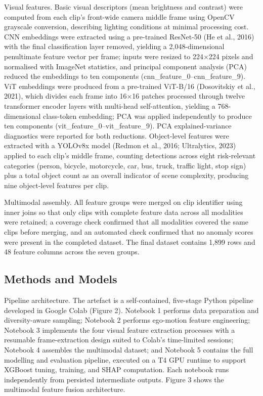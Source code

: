 \documentclass[11pt,a4paper]{article}
\begin{document}
Visual features. Basic visual descriptors (mean brightness and contrast) were computed from each clip's front-wide camera middle frame using OpenCV grayscale conversion, describing lighting conditions at minimal processing cost. CNN embeddings were extracted using a pre-trained ResNet-50 (He et al., 2016) with the final classification layer removed, yielding a 2,048-dimensional penultimate feature vector per frame; inputs were resized to 224$\times$224 pixels and normalised with ImageNet statistics, and principal component analysis (PCA) reduced the embeddings to ten components (cnn\_feature\_0--cnn\_feature\_9). ViT embeddings were produced from a pre-trained ViT-B/16 (Dosovitskiy et al., 2021), which divides each frame into 16$\times$16 patches processed through twelve transformer encoder layers with multi-head self-attention, yielding a 768-dimensional class-token embedding; PCA was applied independently to produce ten components (vit\_feature\_0--vit\_feature\_9). PCA explained-variance diagnostics were reported for both reductions. Object-level features were extracted with a YOLOv8x model (Redmon et al., 2016; Ultralytics, 2023) applied to each clip's middle frame, counting detections across eight risk-relevant categories (person, bicycle, motorcycle, car, bus, truck, traffic light, stop sign) plus a total object count as an overall indicator of scene complexity, producing nine object-level features per clip.

Multimodal assembly. All feature groups were merged on clip identifier using inner joins so that only clips with complete feature data across all modalities were retained; a coverage check confirmed that all modalities covered the same clips before merging, and an automated check confirmed that no anomaly scores were present in the completed dataset. The final dataset contains 1,899 rows and 48 feature columns across the seven groups.

\subsection{Methods and Models}

Pipeline architecture. The artefact is a self-contained, five-stage Python pipeline developed in Google Colab (Figure 2). Notebook 1 performs data preparation and diversity-aware sampling; Notebook 2 performs ego-motion feature engineering; Notebook 3 implements the four visual feature extraction processes with a resumable frame-extraction design suited to Colab's time-limited sessions; Notebook 4 assembles the multimodal dataset; and Notebook 5 contains the full modelling and evaluation pipeline, executed on a T4 GPU runtime to support XGBoost tuning, training, and SHAP computation. Each notebook runs independently from persisted intermediate outputs. Figure 3 shows the multimodal feature fusion architecture.
\end{document}
